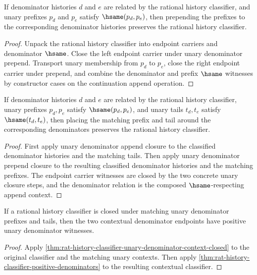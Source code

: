 \begin{theorem}
\label{thm:rat-history-classifier-prepend-unary-denominator-closed}
If denominator histories $d$ and $e$ are related by the rational history
classifier, and unary prefixes $p_d$ and $p_e$ satisfy $\hsame(p_d,p_e)$, then
prepending the prefixes to the corresponding denominator histories preserves the
rational history classifier.
\end{theorem}
\begin{proof}
Unpack the rational history classifier into endpoint carriers and denominator
$\hsame$. Close the left endpoint carrier under unary denominator prepend.
Transport unary membership from $p_d$ to $p_e$, close the right endpoint carrier
under prepend, and combine the denominator and prefix $\hsame$ witnesses by
constructor cases on the continuation append operation.
\end{proof}

\begin{theorem}
\label{thm:rat-history-classifier-unary-denominator-context-closed}
If denominator histories $d$ and $e$ are related by the rational history
classifier, unary prefixes $p_d,p_e$ satisfy $\hsame(p_d,p_e)$, and unary
tails $t_d,t_e$ satisfy $\hsame(t_d,t_e)$, then placing the matching prefix
and tail around the corresponding denominators preserves the rational history
classifier.
\end{theorem}
\begin{proof}
First apply unary denominator append closure to the classified denominator
histories and the matching tails. Then apply unary denominator prepend closure
to the resulting classified denominator histories and the matching prefixes.
The endpoint carrier witnesses are closed by the two concrete unary closure
steps, and the denominator relation is the composed $\hsame$-respecting
append context.
\end{proof}

\begin{theorem}
\label{thm:rat-history-classifier-unary-denominator-context-positive-denominators}
If a rational history classifier is closed under matching unary denominator
prefixes and tails, then the two contextual denominator endpoints have positive
unary denominator witnesses.
\end{theorem}
\begin{proof}
Apply \autoref{thm:rat-history-classifier-unary-denominator-context-closed}
to the original classifier and the matching unary contexts. Then apply
\autoref{thm:rat-history-classifier-positive-denominators} to the resulting
contextual classifier.
\end{proof}

